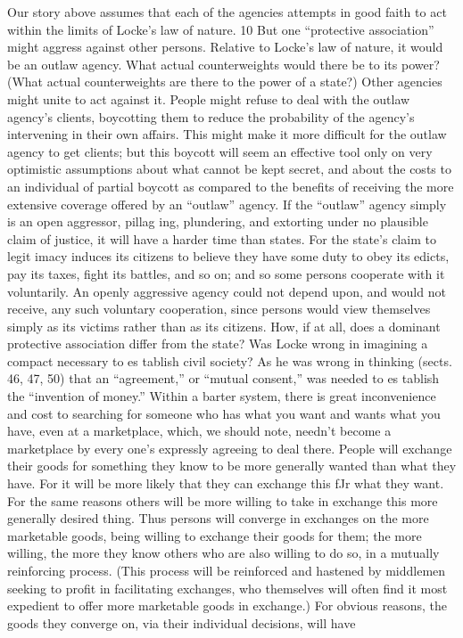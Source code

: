 \documentclass[11pt,openany]{book}
\begin{document}
Our story above assumes that each of the agencies attempts in good faith to act within the limits of Locke's law of nature. 10 But one ``protective association'' might aggress against other persons. Relative to Locke's law of nature, it would be an outlaw agency. What actual counterweights would there be to its power? (What actual counterweights are there to the power of a state?) Other agencies might unite to act against it. People might refuse to deal with the outlaw agency's clients, boycotting them to reduce the probability of the agency's intervening in their own affairs. This might make it more difficult for the outlaw agency to get clients; but this boycott will seem an effective tool only on very optimistic assumptions about what cannot be kept secret, and about the costs to an individual of partial boycott as compared to the benefits of receiving the more extensive coverage offered by an ``outlaw'' agency. If the ``outlaw'' agency simply is an open aggressor, pillag ing, plundering, and extorting under no plausible claim of justice, it will have a harder time than states. For the state's claim to legit imacy induces its citizens to believe they have some duty to obey its edicts, pay its taxes, fight its battles, and so on; and so some persons cooperate with it voluntarily. An openly aggressive agency could not depend upon, and would not receive, any such voluntary cooperation, since persons would view themselves simply as its victims rather than as its citizens. How, if at all, does a dominant protective association differ from the state? Was Locke wrong in imagining a compact necessary to es tablish civil society? As he was wrong in thinking (sects. 46, 47, 50) that an ``agreement,'' or ``mutual consent,'' was needed to es tablish the ``invention of money.'' Within a barter system, there is great inconvenience and cost to searching for someone who has what you want and wants what you have, even at a marketplace, which, we should note, needn't become a marketplace by every one's expressly agreeing to deal there. People will exchange their goods for something they know to be more generally wanted than what they have. For it will be more likely that they can exchange this fJr what they want. For the same reasons others will be more willing to take in exchange this more generally desired thing. Thus persons will converge in exchanges on the more marketable goods, being willing to exchange their goods for them; the more willing, the more they know others who are also willing to do so, in a mutually reinforcing process. (This process will be reinforced and hastened by middlemen seeking to profit in facilitating exchanges, who themselves will often find it most expedient to offer more marketable goods in exchange.) For obvious reasons, the goods they converge on, via their individual decisions, will have 
\end{document}
